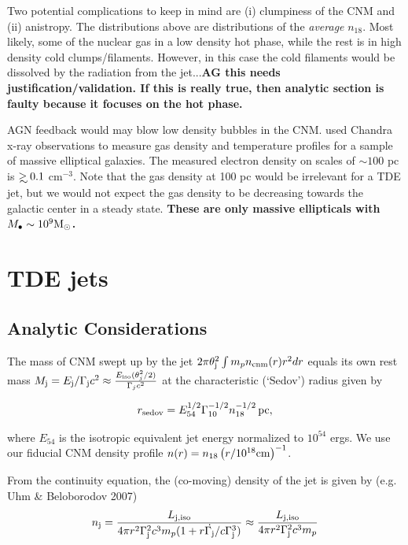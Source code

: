 \documentclass[usenatbib,fleqn]{mnras}
\newcommand\gsim{\mathrel{\rlap{\lower4pt\hbox{\hskip1pt$\sim$}}
    \raise1pt\hbox{$>$}}}
\newcommand{\Mbh}[1][]{M_{\bullet#1}}
\newcommand{\Msun}{{\rm M_\odot}}
\begin{document}
Two potential complications to keep in mind are (i) clumpiness of the
CNM and (ii) anistropy. The distributions above are
distributions of the {\it average} $n_{18}$.  Most likely, some of the
nuclear gas in a low density hot phase, while the rest is in high density
cold clumps/filaments. However, in this case the cold filaments would
be dissolved by the radiation from the jet...{\bf AG this needs
  justification/validation. If this is really true, then analytic
  section is faulty because it focuses on the hot phase.}


AGN feedback would may blow low density bubbles in the
CNM. \citet{Russell+2013} used Chandra x-ray observations to measure gas
density and temperature profiles for a sample of massive elliptical
galaxies. The measured electron density on scales of $\sim 100$ pc is $\gsim 0.1$ cm$^{-3}$. Note that the gas density at 100 pc
would be irrelevant for a TDE jet, but we would not expect the gas
density to be decreasing towards the galactic center in a steady
state. {\bf These are only massive ellipticals with $\Mbh\sim 10^{9} \Msun$.}



\section{TDE jets}
\label{sec:jet}

\subsection{Analytic Considerations}
\label{sec:analytic}


The mass of CNM swept up by the jet $2\pi\theta_{\rm j}^{2}\int m_p
n_{\rm cnm}(r) r^{2}dr$ equals its own rest mass $M_{\rm j} = E_{\rm
  j}/\Gamma_{\rm j}c^{2} \approx \frac{E_{\rm iso}
  (\theta_j^2/2)}{\Gamma_j c^2} $ at the characteristic (`Sedov')
radius given by

\begin{equation}
r_{\rm sedov} = E_{54}^{1/2} \Gamma_{10}^{-1/2} n_{\rm 18}^{-1/2}\,{\rm pc}, 
\end{equation}

where $E_{54}$ is the isotropic equivalent jet energy normalized to
$10^{54}$ ergs. We use our fiducial CNM density profile $n(r)=n_{18}
\left(r/10^{18} {\rm cm}\right)^{-1}$.

From the continuity equation, the (co-moving) density of the jet is
given by (e.g. Uhm \& Beloborodov 2007)
 \begin{align}
   n_{\rm j} =  \frac{L_{\rm j, iso}}{4 \pi r^{2}\Gamma_{\rm
       j}^{2}c^{3}m_p(1 + r \dot{\Gamma_{\rm j}}/c\Gamma_{\rm j}^{3})}
   \approx  \frac{L_{\rm j, iso}}{4 \pi r^{2}\Gamma_{\rm j}^{2}c^{3}m_p}
\end{align}
\end{document}
